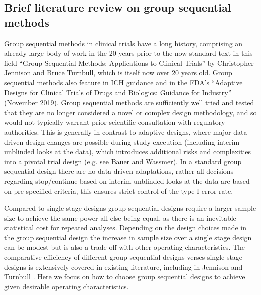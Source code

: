 \documentclass{article}
\begin{document}
\subsection{Brief literature review on group sequential methods}
Group sequential methods in clinical trials have a long history, comprising an already large body of work in the 20 years prior to the now standard text in this field ``Group Sequential Methods: Applications to Clinical Trials'' by Christopher Jennison and Bruce Turnbull\citep{Jennison:2000aa}, which is itself now over 20 years old. Group sequential methods also feature in ICH guidance and in the FDA's ``Adaptive Designs for Clinical Trials of Drugs and Biologics: Guidance for Industry''  (November 2019).  Group sequential methods are sufficiently well tried and tested that they are no longer considered a novel or complex design methodology, and so would not typically warrant prior scientific consultation with regulatory authorities. This is generally in contrast to adaptive designs, where major data-driven design changes are possible during study execution (including interim unblinded looks at the data), which introduces additional risks and complexities into a pivotal trial design (e.g. see Bauer\citep{Bauer:2016aa} and Wassmer\citep{Wassmer:aa}). In a standard group sequential design there are no data-driven adaptations, rather all decisions regarding stop/continue based on interim unblinded looks at the data are based on pre-specified criteria, this ensures strict control of the type I error rate. 

Compared to single stage designs group sequential designs require a larger sample size to achieve the same power all else being equal, as there is an inevitable statistical cost for repeated analyses. Depending on the design choices made in the group sequential design the increase in sample size over a single stage design can be modest but is also a trade off with other operating characteristics. The comparative efficiency of different group sequential designs verses single stage designs is extensively covered in existing literature, including in Jennison and Turnbull \citep{Jennison:2000aa}. Here we focus on how to choose group sequential designs to achieve given desirable operating characteristics.
\end{document}
